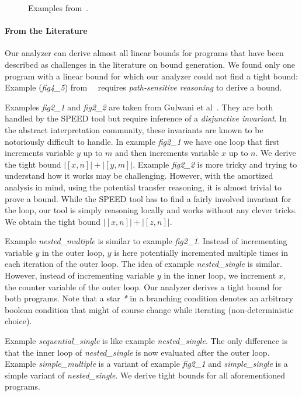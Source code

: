 \documentclass[nocopyrightspace,preprint,pldi]{sigplanconf-pldi15}
\begin{document}
{\begin{figure}
   \caption{Examples from~\cite{GulwaniZ10}.}
  \label{fig:cat3a}
\end{figure}


\paragraph{From  the Literature}

Our analyzer can derive almost all linear bounds for programs that
have been described as challenges in the literature on bound
generation.  We found only one program with a linear bound for
which our analyzer could not find a tight bound:  Example
(\emph{fig4\_5}) from~~\cite{GulwaniJK09} requires \emph{path-sensitive
  reasoning} to derive a bound.

Examples \emph{fig2\_1} and \emph{fig2\_2} are taken from Gulwani et
al~\cite{GulwaniMC09}.  They are both handled by the SPEED tool but
require inference of a \emph{disjunctive invariant}.  In the abstract
interpretation community, these invariants are known to be notoriously
difficult to handle.
%
In example \emph{fig2\_1} we have one loop that first increments
variable $y$ up to $m$ and then increments variable $x$ up to $n$.  We
derive the tight bound $|[x, n]| + |[y, m]|$.
%
Example \emph{fig2\_2} is more tricky and trying to understand how it
works may be challenging.  However, with the amortized analysis in
mind, using the potential transfer reasoning, it is almost trivial to
prove a bound.  While the SPEED tool has to find a fairly
involved invariant for the loop, our tool is simply reasoning locally
and works without any clever tricks. We obtain the tight bound $|[x,
n]| + |[z, n]|$.

Example \emph{nested\_multiple} is similar to example \emph{fig2\_1}.
Instead of incrementing variable $y$ in the outer loop, $y$ is here
potentially incremented multiple times in each iteration of the outer
loop.  The idea of example \emph{nested\_single} is similar.  However,
instead of incrementing variable $y$ in the inner loop, we increment
$x$, the counter variable of the outer loop. Our analyzer derives a
tight bound for both programs.  Note that a star \emph{*} in a
branching condition denotes an arbitrary boolean condition that might
of course change while iterating (non-deterministic choice).

Example \emph{sequential\_single} is like example
\emph{nested\_single}.  The only difference is that the inner loop of
\emph{nested\_single} is now evaluated after the outer loop.  Example
\emph{simple\_multiple} is a variant of example \emph{fig2\_1} and
\emph{simple\_single} is a simple variant of \emph{nested\_single}.
We derive tight bounds for all aforementioned programs.

}
\end{document}
